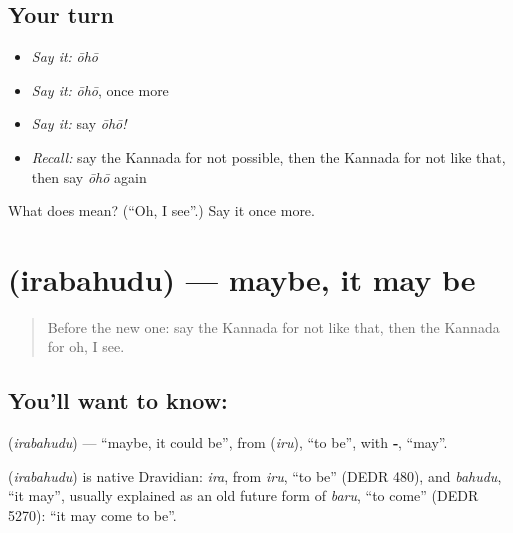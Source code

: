 \subsection*{Your turn}
\begin{itemize}
\raggedright
  \item \emph{Say it:} \emph{ōhō}
  \item \emph{Say it:} \emph{ōhō}, once more
  \item \emph{Say it:} say \emph{ōhō!}
  \item \emph{Recall:} say the Kannada for not possible, then the Kannada for not like that, then say \emph{ōhō} again
\end{itemize}

\begin{tcolorbox}[breakable,colback=teal!4,colframe=teal!35!black,title={Before you move on}]
What does  mean? (\textquotedblleft{}Oh, I see\textquotedblright{}.) Say it once more.
\end{tcolorbox}
\section[\texorpdfstring{\kn{ಇರಬಹುದು} (irabahudu)}{ಇರಬಹುದು (irabahudu)}]{ (irabahudu) — maybe, it may be}

\label{lesson:KA-C95-maybe}



\begin{quote}
Before the new one: say the Kannada for not like that, then the Kannada for oh, I see.
\end{quote}

\subsection*{You'll want to know: }
\textbf{} (\emph{irabahudu}) — \textquotedblleft{}maybe, it could be\textquotedblright{}, from \textbf{} (\emph{iru}), \textquotedblleft{}to be\textquotedblright{}, with \textbf{‑}, \textquotedblleft{}may\textquotedblright{}.

\begin{cousinweb}
\textbf{} (\emph{irabahudu}) is native Dravidian: \emph{ira}, from \emph{iru}, \textquotedblleft{}to be\textquotedblright{} (DEDR 480), and \emph{bahudu}, \textquotedblleft{}it may\textquotedblright{}, usually explained as an old future form of \emph{baru}, \textquotedblleft{}to come\textquotedblright{} (DEDR 5270): \textquotedblleft{}it may come to be\textquotedblright{}.
\end{cousinweb}

